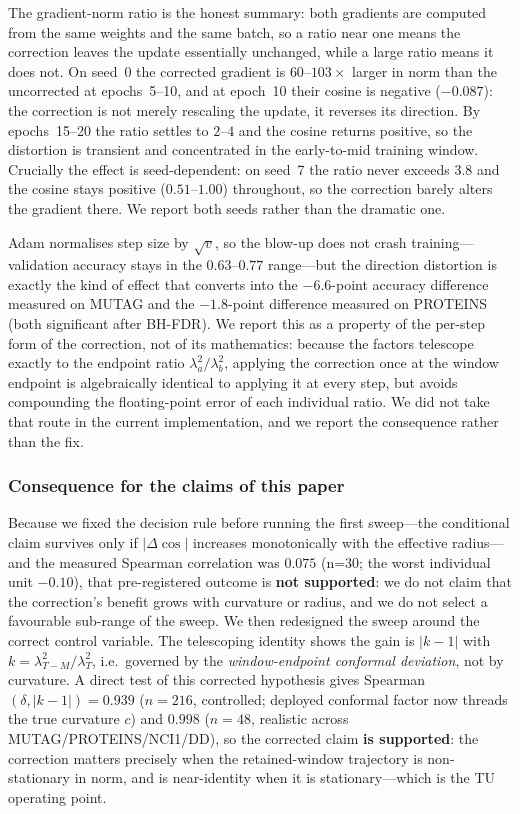 \documentclass[a4paper,fleqn]{cas-dc}
\begin{document}
The gradient-norm ratio is the honest summary: both gradients are computed
from the same weights and the same batch, so a ratio near one means the
correction leaves the update essentially unchanged, while a large ratio
means it does not. On seed~0 the corrected gradient is $60$--$103\times$
larger in norm than the uncorrected at epochs~5--10, and at epoch~10 their
cosine is negative ($-0.087$): the correction is not merely rescaling the
update, it reverses its direction. By epochs~15--20 the ratio settles to
$2$--$4$ and the cosine returns positive, so the distortion is transient
and concentrated in the early-to-mid training window. Crucially the effect
is seed-dependent: on seed~7 the ratio never exceeds $3.8$ and the cosine
stays positive ($0.51$--$1.00$) throughout, so the correction barely alters
the gradient there. We report both seeds rather than the dramatic one.

Adam normalises step size by $\sqrt{v}$, so the blow-up does not crash
training---validation accuracy stays in the $0.63$--$0.77$ range---but the
direction distortion is exactly the kind of effect that converts into the
$-6.6$-point accuracy difference measured on MUTAG and the $-1.8$-point
difference measured on PROTEINS (both significant after BH-FDR). We
report this as a property of the per-step form of the correction, not of
its mathematics: because the factors telescope exactly to the endpoint
ratio $\lambda_a^2/\lambda_b^2$, applying the correction once at the
window endpoint is algebraically identical to applying it at every step,
but avoids compounding the floating-point error of each individual
ratio. We did not take that route in the current implementation, and we
report the consequence rather than the fix.

\subsubsection{Consequence for the claims of this paper}

Because we fixed the decision rule before running the first sweep---the conditional claim survives only if $|\Delta\cos|$ increases monotonically with the effective radius---and the measured Spearman correlation was $0.075$ (n=30; the worst individual unit $-0.10$), that pre-registered outcome is \textbf{not supported}: we do not claim that the correction's benefit grows with curvature or radius, and we do not select a favourable sub-range of the sweep. We then redesigned the sweep around the correct control variable. The telescoping identity shows the gain is $|k-1|$ with $k=\lambda_{T-M}^2/\lambda_T^2$, i.e.\ governed by the \emph{window-endpoint conformal deviation}, not by curvature. A direct test of this corrected hypothesis gives Spearman$(\delta,|k-1|)=0.939$ ($n{=}216$, controlled; deployed conformal factor now threads the true curvature $c$) and $0.998$ ($n{=}48$, realistic across MUTAG/PROTEINS/NCI1/DD), so the corrected claim \textbf{is supported}: the correction matters precisely when the retained-window trajectory is non-stationary in norm, and is near-identity when it is stationary---which is the TU operating point.
\end{document}

